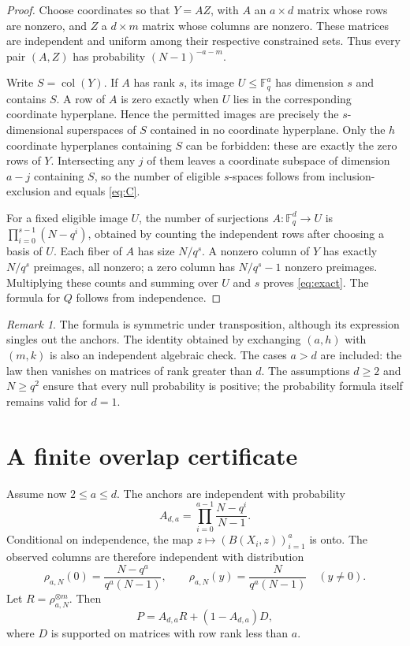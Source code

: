 \documentclass[11pt]{article}
\theoremstyle{remark}\newtheorem{remark}[theorem]{Remark}
\newcommand{\F}{\mathbb F_q}
\begin{document}
\begin{proof}
Choose coordinates so that $Y=AZ$, with $A$ an $a\times d$ matrix whose rows are nonzero, and $Z$ a $d\times m$ matrix whose columns are nonzero. These matrices are independent and uniform among their respective constrained sets. Thus every pair $(A,Z)$ has probability $(N-1)^{-a-m}$.

Write $S=\operatorname{col}(Y)$. If $A$ has rank $s$, its image $U\le\F^a$ has dimension $s$ and contains $S$. A row of $A$ is zero exactly when $U$ lies in the corresponding coordinate hyperplane. Hence the permitted images are precisely the $s$-dimensional superspaces of $S$ contained in no coordinate hyperplane. Only the $h$ coordinate hyperplanes containing $S$ can be forbidden: these are exactly the zero rows of $Y$. Intersecting any $j$ of them leaves a coordinate subspace of dimension $a-j$ containing $S$, so the number of eligible $s$-spaces follows from inclusion-exclusion and equals \eqref{eq:C}.

For a fixed eligible image $U$, the number of surjections $A:\F^d\to U$ is $\prod_{i=0}^{s-1}(N-q^i)$, obtained by counting the independent rows after choosing a basis of $U$. Each fiber of $A$ has size $N/q^s$. A nonzero column of $Y$ has exactly $N/q^s$ preimages, all nonzero; a zero column has $N/q^s-1$ nonzero preimages. Multiplying these counts and summing over $U$ and $s$ proves \eqref{eq:exact}. The formula for $Q$ follows from independence.
\end{proof}

\begin{remark}
The formula is symmetric under transposition, although its expression singles out the anchors. The identity obtained by exchanging $(a,h)$ with $(m,k)$ is also an independent algebraic check. The cases $a>d$ are included: the law then vanishes on matrices of rank greater than $d$. The assumptions $d\ge2$ and $N\ge q^2$ ensure that every null probability is positive; the probability formula itself remains valid for $d=1$.
\end{remark}

\section{A finite overlap certificate}
Assume now $2\le a\le d$. The anchors are independent with probability
\begin{equation}\label{eq:alpha-finite}
 A_{d,a}=\prod_{i=0}^{a-1}\frac{N-q^i}{N-1}.
\end{equation}
Conditional on independence, the map $z\mapsto(B(X_i,z))_{i=1}^a$ is onto. The observed columns are therefore independent with distribution
\begin{equation}\label{eq:rho}
 \rho_{a,N}(0)=\frac{N-q^a}{q^a(N-1)},\qquad
 \rho_{a,N}(y)=\frac{N}{q^a(N-1)}\quad(y\ne0).
\end{equation}
Let $R=\rho_{a,N}^{\otimes m}$. Then
\begin{equation}\label{eq:mixture}
 P=A_{d,a}R+(1-A_{d,a})D,
\end{equation}
where $D$ is supported on matrices with row rank less than $a$.
\end{document}
